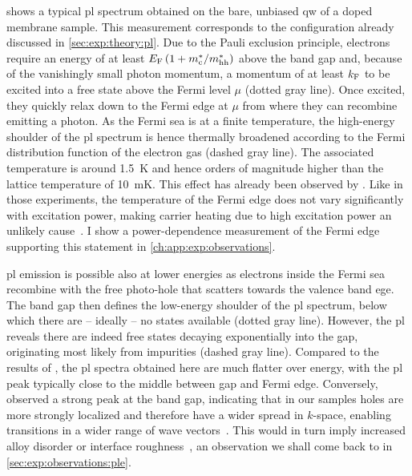  shows a typical \gls{pl} spectrum obtained on the bare, unbiased \gls{qw} of a doped membrane sample.
This measurement corresponds to the configuration already discussed in \cref{sec:exp:theory:pl}.
Due to the Pauli exclusion principle, electrons require an energy of at least $E_{\mathrm{F}}\left(1 + m_{\mathrm{c}}^\ast/m_{\mathrm{hh}}^\ast\right)$ above the band gap and, because of the vanishingly small photon momentum, a momentum of at least $k_{\mathrm{F}}$ to be excited into a free state above the Fermi level $\mu$ (dotted gray line).
Once excited, they quickly relax down to the Fermi edge at $\mu$ from where they can recombine emitting a photon.
As the Fermi sea is at a finite temperature, the high-energy shoulder of the \gls{pl} spectrum is hence thermally broadened according to the Fermi distribution function of the electron gas (dashed gray line).
The associated temperature is around \qty{1.5}{\kelvin} and hence orders of magnitude higher than the lattice temperature of \qty{10}{\milli\kelvin}.
This effect has already been observed by \citet{Pinczuk1984}.
Like in those experiments, the temperature of the Fermi edge does not vary significantly with excitation power, making carrier heating due to high excitation power an unlikely cause~\cite{Ulbrich1973}.
I show a power-dependence measurement of the Fermi edge supporting this statement in \cref{ch:app:exp:observations}.

\Gls{pl} emission is possible also at lower energies as electrons inside the Fermi sea recombine with the free photo-hole that scatters towards the valence band ege.
The band gap then defines the low-energy shoulder of the \gls{pl} spectrum, below which there are -- ideally -- no states available (dotted gray line).
However, the \gls{pl} reveals there are indeed free states decaying exponentially into the gap, originating most likely from impurities (dashed gray line).
Compared to the results of \citet{Kamburov2017}, the \gls{pl} spectra obtained here are much flatter over energy, with the \gls{pl} peak typically close to the middle between gap and Fermi edge.
Conversely, \citet{Kamburov2017} observed a strong peak at the band gap,
indicating that in our samples holes are more strongly localized and therefore have a wider spread in $k$-space, enabling transitions in a wider range of wave vectors~\cite{Skolnick1987}.
This would in turn imply increased alloy disorder or interface roughness~\cite{Gabbay2008}, an observation we shall come back to in \cref{sec:exp:observations:ple}.

